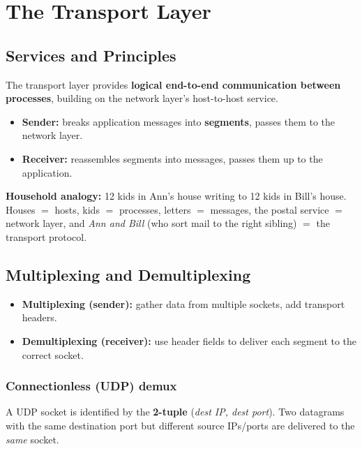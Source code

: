\documentclass[hidelinks]{article}
\begin{document}
\section{The Transport Layer}

\subsection{Services and Principles}

The transport layer provides \textbf{logical end-to-end communication between
processes}, building on the network layer's host-to-host service.
\begin{itemize}
    \item \textbf{Sender:} breaks application messages into
    \textbf{segments}, passes them to the network layer.
    \item \textbf{Receiver:} reassembles segments into messages, passes them
    up to the application.
\end{itemize}

\noindent\textbf{Household analogy:} 12 kids in Ann's house writing to 12 kids
in Bill's house. Houses $=$ hosts, kids $=$ processes, letters $=$ messages,
the postal service $=$ network layer, and \emph{Ann and Bill}
(who sort mail to the right sibling) $=$ the transport protocol.

\subsection{Multiplexing and Demultiplexing}

\begin{itemize}
    \item \textbf{Multiplexing (sender):} gather data from multiple sockets,
    add transport headers.
    \item \textbf{Demultiplexing (receiver):} use header fields to deliver
    each segment to the correct socket.
\end{itemize}

\subsubsection{Connectionless (UDP) demux}
A UDP socket is identified by the \textbf{2-tuple}
(\emph{dest IP, dest port}). Two datagrams with the same destination port but
different source IPs/ports are delivered to the \emph{same} socket.
\end{document}

